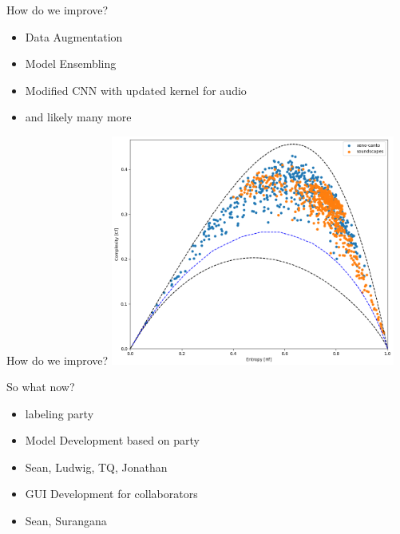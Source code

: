 \begin{frame}{How do we improve?}
    \begin{itemize}
        \item Data Augmentation
        \item Model Ensembling
        \item Modified CNN with updated kernel for audio
        \item and likely many more
    \end{itemize}
\end{frame}

%


\begin{frame}{How do we improve?}
    \centering
    \includegraphics[height=0.7\textheight,width=0.7\textwidth,keepaspectratio]{images/egci.png}
\end{frame}

\begin{frame}{So what now?}
    \begin{itemize}
        \item labeling party
        \item Model Development based on party
        \item Sean, Ludwig, TQ, Jonathan
        \item GUI Development for collaborators
        \item Sean, Surangana
    \end{itemize}
\end{frame}
